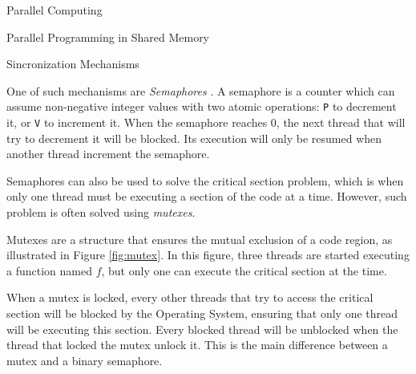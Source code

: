 \begin{section}{Parallel Computing}
\begin{subsection}{Parallel Programming in Shared Memory}
\begin{subsubsection}{Sincronization Mechanisms}

	One of such mechanisms are \textit{Semaphores} \citep{dijkstra1965}.
A semaphore is a counter which can assume non-negative integer values
with two atomic operations: \texttt{P} to decrement it, or \texttt{V}
to increment it. When the semaphore reaches 0, the next thread that
will try to decrement it will be blocked. Its execution will only be
resumed when another thread increment the semaphore.


	Semaphores can also be used to solve the critical section problem,
	which is when only one thread must be executing a section of the
	code at a time. However, such problem is often solved using
	\textit{mutexes}.


	Mutexes are a structure that ensures the mutual exclusion of a
	code region, as illustrated in Figure \ref{fig:mutex}. In this
	figure, three threads are started executing a function named $f$,
	but only one can execute the critical section at the time.


	When a mutex is locked, every other threads that try to access
	the critical section will be blocked by the Operating System,
	ensuring that only one thread will be executing this section.
	Every blocked thread will be unblocked when the thread that
	locked the mutex unlock it. This is the main difference between
	a mutex and a binary semaphore.


\end{subsubsection}
\end{subsection}
\end{section}
